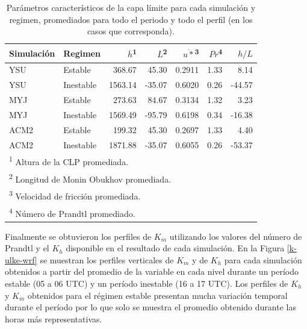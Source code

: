 \documentclass[12pt,spanish,oneside, a4paper]{book}
\begin{document}
\begin{table}

\caption{\label{tab:tabla-clp}Parámetros característicos de la capa límite para cada simulación y regimen, promediados para todo el periodo y todo el perfil (en los casos que corresponda). \label{tabla-clp}}
\centering
\begin{tabular}[t]{llrrrrr}
\toprule
Simulación & Regimen & $\overline{h}$\textsuperscript{1} & $\overline{L}$\textsuperscript{2} & $\overline{u*}$\textsuperscript{3} & $\overline{Pr}$\textsuperscript{4} & $h/L$\\
\midrule
YSU & Estable & 368.67 & 45.30 & 0.2911 & 1.33 & 8.14\\
YSU & Inestable & 1563.14 & -35.07 & 0.6020 & 0.26 & -44.57\\
MYJ & Estable & 273.63 & 84.67 & 0.3134 & 1.32 & 3.23\\
MYJ & Inestable & 1569.49 & -95.79 & 0.6198 & 0.34 & -16.38\\
ACM2 & Estable & 199.32 & 45.30 & 0.2697 & 1.33 & 4.40\\
ACM2 & Inestable & 1871.88 & -35.07 & 0.6055 & 0.26 & -53.37\\
\bottomrule
\multicolumn{7}{l}{\textsuperscript{1} Altura de la CLP promediada.}\\
\multicolumn{7}{l}{\textsuperscript{2} Longitud de Monin Obukhov promediada.}\\
\multicolumn{7}{l}{\textsuperscript{3} Velocidad de fricción promediada.}\\
\multicolumn{7}{l}{\textsuperscript{4} Número de Prandtl promediado.}\\
\end{tabular}
\end{table}

Finalmente se obtuvieron los perfiles de \(K_m\) utilizando los valores
del número de Prandtl y el \(K_h\) disponible en el resultado de cada
simulación. En la Figura \ref{k-ulke-wrf} se muestran los perfiles
verticales de \(K_m\) y de \(K_h\) para cada simulación obtenidos a
partir del promedio de la variable en cada nivel durante un período
estable (05 a 06 UTC) y un período inestable (16 a 17 UTC). Los perfiles
de \(K_h\) y \(K_m\) obtenidos para el régimen estable presentan mucha
variación temporal durante el período por lo que solo se muestra el
promedio obtenido durante las horas más representativas.
\end{document}

